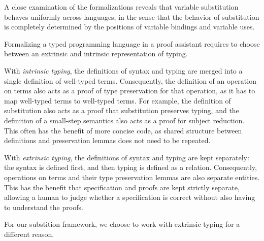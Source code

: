 \documentclass[sigplan,10pt, anonymous]{acmart}
\begin{document}
  

  A close examination of the formalizations reveals that variable
  substitution behaves uniformly across languages, in the sense that
  the behavior of substitution is completely determined by the positions
  of variable bindings and variable uses.


  Formalizing a typed programming language in a proof assistant
  requires to choose between an extrinsic and intrinsic representation
  of typing.

  With \emph{intrinsic typing}, the definitions of syntax and typing
  are merged into a single definition of well-typed terms.
  Consequently, the definition of an operation on terms also acts
  as a proof of type preservation for that operation, as it has to
  map well-typed terms to well-typed terms.
  For example, the definition of substitution
  also acts as a proof that substitution preserves typing, and the
  definition of a small-step semantics also acts as a proof for subject
  reduction.
  This often has the benefit of more concise code, as shared structure
  between definitions and preservation lemmas does not need to be
  repeated.

  With \emph{extrinsic typing}, the definitions of syntax and typing
  are kept separately: the syntax is defined first, and then typing is
  defined as a relation. Consequently, operations on terms and
  their type preservation lemmas are also separate entities.
  This has the benefit that specification and proofs are kept strictly separate,
  allowing a human to judge whether a specification is correct without also
  having to understand the proofs.

  For our substition framework, we choose to work with extrinsic
  typing for a different reason.


\end{document}
